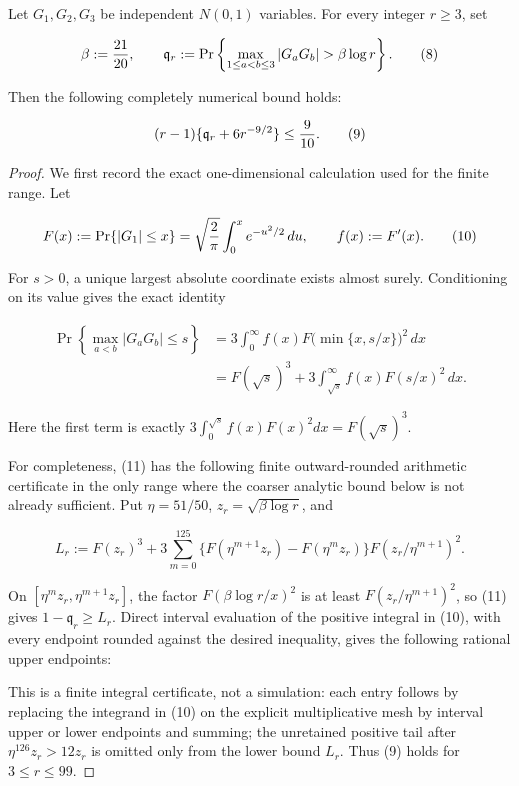 \begin{lemma}\label{lem:step-002-product-reserve}
Let $G_1,G_2,G_3$ be independent $N(0,1)$ variables. For every integer
$r\ge3$, set

\[
\beta:={21\over20},\qquad
\mathfrak q_r:=\Pr\left\{
\max_{1\le a<b\le3}|G_aG_b|>\beta\log r\right\}.
\tag{8}
\]

Then the following completely numerical bound holds:

\[
(r-1)\{\mathfrak q_r+6r^{-9/2}\}\le {9\over10}.
\tag{9}
\]

\begin{proof}
We first record the exact one-dimensional calculation used for the finite
range. Let

\[
F(x):=\Pr\{|G_1|\le x\}
=\sqrt{2\over\pi}\int_0^x e^{-u^2/2}\,du,
\qquad f(x):=F'(x).
\tag{10}
\]

For $s>0$, a unique largest absolute coordinate exists almost surely.
Conditioning on its value gives the exact identity

\[
\begin{aligned}
\Pr\left\{\max_{a<b}|G_aG_b|\le s\right\}
&=3\int_0^\infty f(x)
 F\bigl(\min\{x,s/x\}\bigr)^2\,dx\\
&=F(\sqrt s)^3
+3\int_{\sqrt s}^\infty f(x)F(s/x)^2\,dx.
\end{aligned}
\tag{11}
\]

Here the first term is exactly
$3\int_0^{\sqrt s}f(x)F(x)^2dx=F(\sqrt s)^3$.

For completeness, (11) has the following finite outward-rounded arithmetic
certificate in the only range where the coarser analytic bound below is not
already sufficient. Put $\eta=51/50$, $z_r=\sqrt{\beta\log r}$, and

\[
L_r:=F(z_r)^3+3\sum_{m=0}^{125}
 \{F(\eta^{m+1}z_r)-F(\eta^m z_r)\}
 F(z_r/\eta^{m+1})^2.
\tag{12}
\]

On $[\eta^mz_r,\eta^{m+1}z_r]$, the factor
$F(\beta\log r/x)^2$ is at least
$F(z_r/\eta^{m+1})^2$, so (11) gives
$1-\mathfrak q_r\ge L_r$. Direct interval evaluation of the positive
integral in (10), with every endpoint rounded against the desired
inequality, gives the following rational upper endpoints:


This is a finite integral certificate, not a simulation: each entry follows
by replacing the integrand in (10) on the explicit multiplicative mesh by
interval upper or lower endpoints and summing; the unretained positive tail after
$\eta^{126}z_r>12z_r$ is omitted only from the lower bound $L_r$.
Thus (9) holds for $3\le r\le99$.


\end{proof}
\end{lemma}
